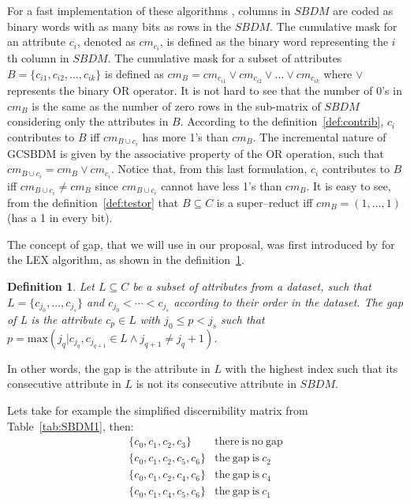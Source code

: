 \documentclass[authoryear,preprint,review,12pt]{elsarticle}
\newtheorem{definition}{Definition}
\begin{document}
	For a fast implementation of these algorithms \citep{Sanchez10,Lias13}, columns in $SBDM$ are coded as binary
	words with as many bits as rows in the $SBDM$. The cumulative mask for an attribute $c_i$, denoted as $cm_{c_i}$, is defined as the binary word representing the $i$th column in $SBDM$. The cumulative mask for a subset of attributes $B=\lbrace c_{i1},c_{i2},...,c_{ik} \rbrace$ is defined	as $cm_B = cm_{c_{i1}} \vee cm_{c_{i2}} \vee ... \vee cm_{c_{ik}}$ where $\vee$ represents the binary OR operator. It is not hard to see that the number of 0's in $cm_B$ is the same as the number of zero rows in the sub-matrix of $SBDM$ considering only the attributes in $B$. 
	According to the definition~\ref{def:contrib}, $c_i$ contributes to $B$ iff $cm_{B\cup c_i}$ has more 1's than 
	$cm_B$. The incremental nature of GCSBDM is given by the associative property of the OR operation, such that 
	$cm_{B\cup c_i}=cm_B\vee cm_{c_i}$. Notice that, from this last formulation, $c_i$ contributes to $B$ iff 
	$cm_{B\cup c_i}\neq cm_B$ since $cm_{B\cup c_i}$ cannot have less 1's than $cm_B$. It is easy to see, from the
	definition~\ref{def:testor} that $B \subseteq C$ is a super--reduct iff $cm_B=(1,...,1)$ (has a 1 in every bit).

	The concept of gap, that we will use in our proposal, was first introduced by \cite{Santiesteban03} for 
	the LEX algorithm, as shown in the definition~\ref{def:gap}.
	
	\begin{definition}\label{def:gap}
		Let $L \subseteq C$ be a subset of attributes from a dataset, such that $L = \lbrace c_{j_0},...,c_{j_s}
		\rbrace$ and $c_{j_0}<\cdots <c_{j_s}$ according to their order in the dataset. The gap of L is the
		attribute $c_p \in L$ with $j_0 \leq p <	j_s$ such that $p=\mathrm{max}(j_q | c_{j_q},c_{j_{q+1}} \in 
		L \wedge j_{q+1} \neq j_q+1)$.
	\end{definition}
	
	In other words, the gap is the attribute in $L$ with the highest index such that its consecutive attribute in 
	$L$ is not its consecutive attribute in $SBDM$.
	
	Lets take for example the simplified discernibility matrix from Table~\ref{tab:SBDM1}, then:
	$$\begin{array}{ll}
	\lbrace c_0,c_1,c_2,c_3\rbrace 		& \mathrm{there~is~no~gap}\\
	\lbrace c_0,c_1,c_2,c_5,c_6\rbrace 	& \mathrm{the~gap~is~} c_2\\
	\lbrace c_0,c_1,c_2,c_4,c_6\rbrace 	& \mathrm{the~gap~is~} c_4\\
	\lbrace c_0,c_1,c_4,c_5,c_6\rbrace 	& \mathrm{the~gap~is~} c_1
	\end{array}$$
	
\end{document}
